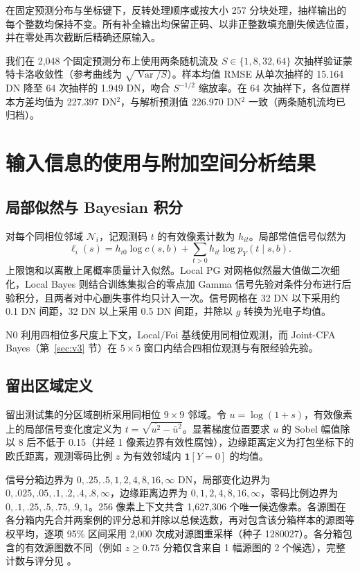 \documentclass[10pt,twocolumn,journal]{IEEEtran}
\begin{document}
在固定预测分布与坐标键下，反转处理顺序或按大小 257 分块处理，抽样输出的每个整数均保持不变。所有补全输出均保留正码、以非正整数填充删失候选位置，并在零处再次截断后精确还原输入。

我们在 2,048 个固定预测分布上使用两条随机流及 $S\in\{1,8,32,64\}$ 次抽样验证蒙特卡洛收敛性（参考曲线为 $\sqrt{\operatorname{Var}/S}$）。样本均值 RMSE 从单次抽样的 15.164 DN 降至 64 次抽样的 1.949 DN，吻合 $S^{-1/2}$ 缩放率。在 64 次抽样下，各位置样本方差均值为 227.397 DN$^2$，与解析预测值 226.970 DN$^2$ 一致（两条随机流均已归档）。

\section{输入信息的使用与附加空间分析结果}
\subsection{局部似然与 Bayesian 积分}
对每个同相位邻域 $\mathcal N_i$，记观测码 $t$ 的有效像素计数为 $h_{it}$。局部常值信号似然为
\begin{equation}
\ell_i(s)=h_{i0}\log c(s,b)+\sum_{t>0}h_{it}\log p_Y(t\mid s,b).
\end{equation}
上限饱和以离散上尾概率质量计入似然。Local PG 对网格似然最大值做二次细化，Local Bayes 则结合训练集拟合的零点加 Gamma 信号先验对条件分布进行后验积分，且两者对中心删失事件均只计入一次。信号网格在 32 DN 以下采用约 0.1 DN 间距，32 DN 以上采用 0.5 DN 间距，并除以 $g$ 转换为光电子均值。

N0 利用四相位多尺度上下文，Local/Foi 基线使用同相位观测，而 Joint-CFA Bayes（第~\ref{sec:v3} 节）在 $5\times5$ 窗口内结合四相位观测与有限经验先验。

\subsection{留出区域定义}\label{sec:regionaldefinitions}
留出测试集的分区域剖析采用同相位 $9\times9$ 邻域。令 $u=\log(1+s)$，有效像素上的局部信号变化度定义为 $t=\sqrt{\overline{u^2}-\bar u^2}$。显著梯度位置要求 $u$ 的 Sobel 幅值除以 8 后不低于 0.15（并经 1 像素边界有效性腐蚀），边缘距离定义为打包坐标下的欧氏距离，观测零码比例 $z$ 为有效邻域内 $\mathbf1[Y=0]$ 的均值。

信号分箱边界为 $0,.25,.5,1,2,4,8,16,\infty$ DN，局部变化边界为 $0,.025,.05,.1,.2,.4,.8,\infty$，边缘距离边界为 $0,1,2,4,8,16,\infty$，零码比例边界为 $0,.1,.25,.5,.75,.9,1$。256 像素上下文共含 1,627,306 个唯一候选像素。各源图在各分箱内先合并两案例的评分总和并除以总候选数，再对包含该分箱样本的源图等权平均，逐项 95\% 区间采用 2,000 次成对源图重采样（种子 1280027）。各分箱包含的有效源图数不同（例如 $z\geq0.75$ 分箱仅含来自 1 幅源图的 2 个候选），完整计数与评分见 。
\end{document}
